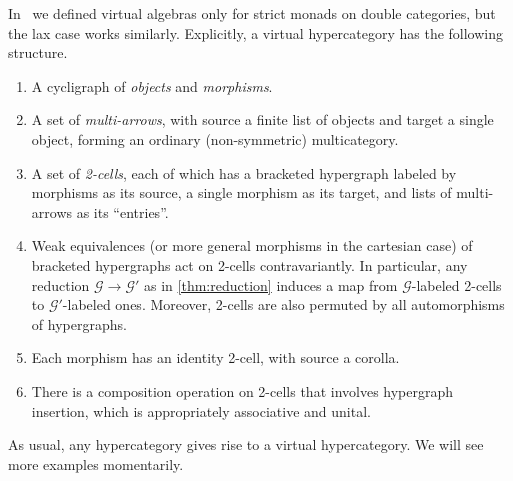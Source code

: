 \documentclass{article}
\theoremstyle{definition}
\newtheorem{defn}[thm]{Definition}
\theoremstyle{remark}
\def\M{\mathbb{M}}
\def\G{\mathcal{G}}
\begin{document}
In~\cite{cs:multicats} we defined virtual algebras only for strict monads on double categories, but the lax case works similarly.
Explicitly, a virtual hypercategory has the following structure.
\begin{enumerate}
\item A cycligraph of \emph{objects} and \emph{morphisms}.
\item A set of \emph{multi-arrows}, with source a finite list of objects and target a single object, forming an ordinary (non-symmetric) multicategory.
\item A set of \emph{2-cells}, each of which has a bracketed hypergraph labeled by morphisms as its source, a single morphism as its target, and lists of multi-arrows as its ``entries''.
\item Weak equivalences (or more general morphisms in the cartesian case) of bracketed hypergraphs act on 2-cells contravariantly.
  In particular, any reduction $\G\to \G'$ as in \cref{thm:reduction} induces a map from $\G$-labeled 2-cells to $\G'$-labeled ones.
  Moreover, 2-cells are also permuted by all automorphisms of hypergraphs.
\item Each morphism has an identity 2-cell, with source a corolla.
\item There is a composition operation on 2-cells that involves hypergraph insertion, which is appropriately associative and unital.
\end{enumerate}

As usual, any hypercategory gives rise to a virtual hypercategory.
We will see more examples momentarily.


\end{document}
